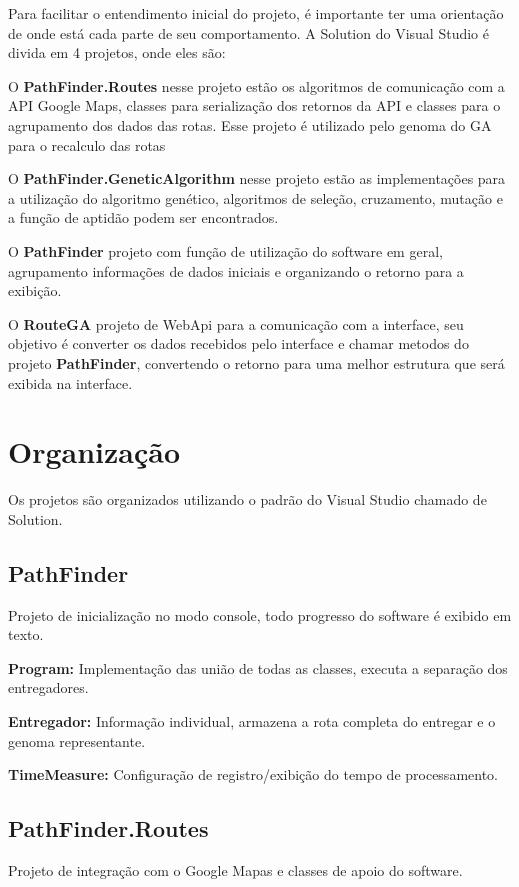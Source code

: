 Para facilitar o entendimento inicial do projeto, é importante ter uma orientação de onde está cada parte de seu comportamento. A Solution do Visual Studio é divida em 4 projetos, onde eles são:

O \textbf{PathFinder.Routes} nesse projeto estão os algoritmos de comunicação com a  API Google Maps, classes para serialização dos retornos da API e classes para o agrupamento dos dados das rotas. Esse projeto é utilizado pelo genoma do GA para o recalculo das rotas

O \textbf{PathFinder.GeneticAlgorithm} nesse projeto estão as implementações para a utilização do algoritmo genético, algoritmos de seleção, cruzamento, mutação e a função de aptidão podem ser encontrados. 

O \textbf{PathFinder} projeto com função de utilização do software em geral, agrupamento informações de dados iniciais e organizando o retorno para a exibição.

O \textbf{RouteGA} projeto de WebApi para a comunicação com a interface, seu objetivo é converter os dados recebidos pelo interface e chamar metodos do projeto \textbf{PathFinder}, convertendo o retorno para uma melhor estrutura que será exibida na interface.

\section{Organização}
Os projetos são organizados utilizando o padrão do Visual Studio chamado de Solution.

\subsection{PathFinder}
Projeto de inicialização no modo console, todo progresso do software é exibido em texto.

\textbf{Program:} Implementação das união de todas as classes, executa a separação dos entregadores.

\textbf{Entregador:} Informação individual, armazena a rota completa do entregar e o genoma representante.

\textbf{TimeMeasure:} Configuração de registro/exibição do tempo de processamento.
\subsection{PathFinder.Routes}

Projeto de integração com o Google Mapas e classes de apoio do software.


